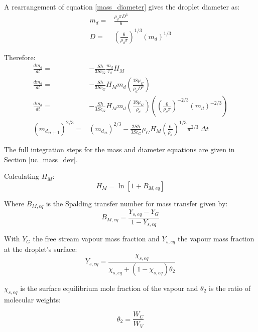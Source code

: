 \documentclass[../Interim_Report_Master]{subfiles}
\begin{document}
A rearrangement of equation \ref{mass_diameter} gives the droplet diameter as:
\begin{subequations}
\begin{align}
m_d =& \frac{\rho_d \pi D^3}{6} \\
D = & \left(\frac{6}{\rho_d \pi}\right)^{1/3} \left(m_d\right)^{1/3}
\end{align}
\end{subequations}
 
Therefore:
\begin{subequations}
\begin{align}
\frac{dm_d}{dt} =& -\frac{Sh}{3Sc_G}\frac{m_d}{\tau_d}H_M \\
\frac{dm_d}{dt} =& -\frac{Sh}{3Sc_G} H_M m_d\left(\frac{18\mu_G}{\rho_d D^2}\right)\\
\frac{dm_d}{dt} =& -\frac{Sh}{3Sc_G} H_M m_d\left(\frac{18\mu_G}{\rho_d}\right)\left(\left(\frac{6}{\rho_d \pi}\right)^{-2/3} \left(m_d\right)^{-2/3}\right)\\
\left({m_d}_{n+1}\right)^{2/3} =& \left({m_d}_{n}\right)^{2/3} - \frac{2Sh}{3Sc_G}\mu_G H_M \left(\frac{6}{\rho_d}\right)^{1/3}\pi^{2/3} ~ \Delta t
\end{align}
\end{subequations}

The full integration steps for the mass and diameter equations are given in Section \ref{uc_mass_dev}.

Calculating $H_M$:
\begin{equation}
H_M=\ln\left[1+B_{M,eq}\right]
\end{equation}

Where $B_{M,eq}$ is the Spalding transfer number for mass transfer given by:
\begin{equation}
B_{M,eq} = \frac{Y_{s,eq}-Y_G}{1-Y_{s,eq}}
\end{equation}

With $Y_G$ the free stream vapour mass fraction and $Y_{s,eq}$ the vapour mass fraction at the droplet's surface:
\begin{equation}
Y_{s,eq} = \frac{\chi_{s,eq}}{\chi_{s,eq}+(1-\chi_{s,eq})\theta_2}
\end{equation}

$\chi_{s,eq}$ is the surface equilibrium mole fraction of the vapour and $\theta_2$ is the ratio of molecular weights:

\begin{equation}
\theta_2=\frac{W_C}{W_V}
\end{equation}
\end{document}
